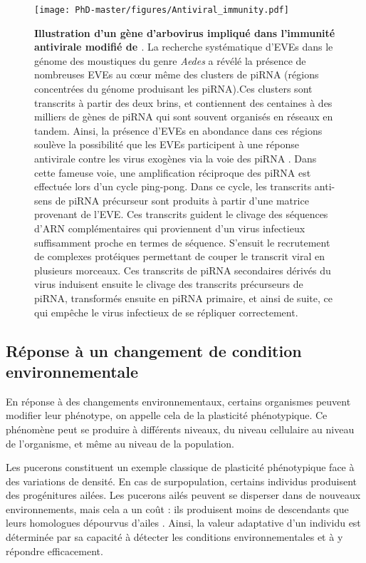 \begin{figure}[!htpbt]
\captionsetup{font=footnotesize}
 \centering
  \texttt{[image: PhD-master/figures/Antiviral\_immunity.pdf]}
\caption[Intro:Illustration d'un gène d'arbovirus impliqué dans l'immunité antivirale chez le moustique]{\textbf{Illustration d'un gène d'arbovirus impliqué dans l'immunité antivirale modifié de \cite{suzuki_non-retroviral_2020}}. La recherche systématique d'EVEs dans le génome des moustiques du genre \textit{Aedes} a révélé la présence de nombreuses EVEs au cœur même des clusters de piRNA (régions concentrées du génome produisant les piRNA).Ces clusters sont transcrits à partir des deux brins, et contiennent des centaines à des milliers de gènes de piRNA qui sont souvent organisés en réseaux en tandem. Ainsi, la présence d'EVEs en abondance dans ces régions  soulève la possibilité  que les EVEs participent à une réponse antivirale contre les virus exogènes via la voie des piRNA \citep{palatini_comparative_2017,suzuki_uncovering_2017}. Dans cette fameuse voie, une amplification réciproque des piRNA est effectuée lors d'un cycle ping-pong. Dans ce cycle, les transcrits anti-sens de piRNA précurseur sont produits à partir d'une matrice provenant de l'EVE. Ces transcrits guident le clivage des séquences d'ARN complémentaires qui proviennent d'un virus infectieux suffisamment proche en termes de séquence. S'ensuit le recrutement de complexes protéiques permettant de couper le transcrit viral en plusieurs morceaux. Ces transcrits de piRNA secondaires dérivés du virus induisent ensuite le clivage des transcrits précurseurs de piRNA, transformés ensuite en piRNA primaire, et ainsi de suite, ce qui empêche le virus infectieux de se répliquer correctement.}
\label{figure:Antiviral_immunity}
\end{figure}

\subsection{Réponse à un changement de condition environnementale}

En réponse à des changements environnementaux, certains organismes peuvent modifier leur phénotype, on appelle cela de la plasticité phénotypique. Ce phénomène peut se produire à différents niveaux, du niveau cellulaire au niveau de l'organisme, et même au niveau de la population.

Les pucerons constituent un exemple classique de plasticité phénotypique face à des variations de densité. En cas de surpopulation, certains individus produisent des progénitures ailées. Les pucerons ailés peuvent se disperser dans de nouveaux environnements, mais cela a un coût : ils produisent moins de descendants que leurs homologues dépourvus d'ailes \citep{sutherland_role_1969}. Ainsi, la valeur adaptative d'un individu est déterminée par sa capacité à détecter les conditions environnementales et à y répondre efficacement. 

